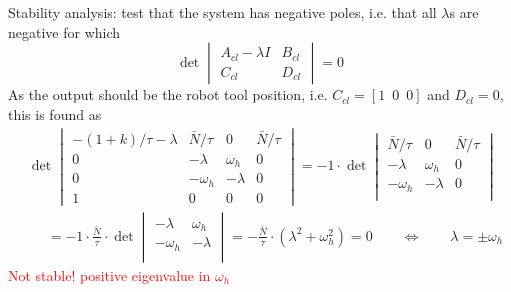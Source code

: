 Stability analysis: test that the system has negative poles, i.e. that all $\lambda$s are negative for which
\begin{equation}
\det\begin{vmatrix}
A_{cl}-\lambda I & B_{cl}\\C_{cl}&D_{cl}
\end{vmatrix}=0
\end{equation}
As the output should be the robot tool position, i.e. $C_{cl}=[1\,\,\,0\,\,\,0]$ and $D_{cl}=0$, this is found as
\begin{align}
&\det\begin{vmatrix}
-(1+k)/\tau-\lambda & \bar{N}/\tau & 0 & \bar{N}/\tau\\
0 & -\lambda  & \omega_h  & 0\\ 
0 & -\omega_h & -\lambda & 0\\
1 & 0 & 0 & 0
\end{vmatrix}
= 
-1 \cdot \det\begin{vmatrix}
\bar{N}/\tau & 0 & \bar{N}/\tau\\
-\lambda & \omega_h  & 0\\ 
-\omega_h & -\lambda & 0\\
\end{vmatrix} \nonumber\\
&\phantom{det}= -1\cdot \frac{\bar{N}}{\tau} \cdot \det 
\begin{vmatrix}
-\lambda & \omega_h\\
-\omega_h &  -\lambda\\
\end{vmatrix}
= -\frac{\bar{N}}{\tau} \cdot (\lambda^2 +\omega_h^2)
= 0 \qquad \Leftrightarrow \qquad \lambda = \pm\omega_h
\end{align}
\textcolor{red}{Not stable! positive eigenvalue in $\omega_h$}

